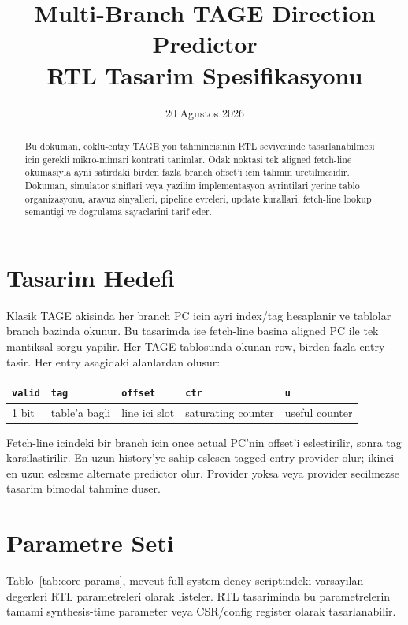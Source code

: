 \documentclass[11pt,a4paper]{article}
\title{Multi-Branch TAGE Direction Predictor\\RTL Tasarim Spesifikasyonu}
\author{}
\date{20 Agustos 2026}
\newcommand{\code}[1]{\texttt{#1}}
\begin{document}
\maketitle

\begin{abstract}
Bu dokuman, coklu-entry TAGE yon tahmincisinin RTL seviyesinde
tasarlanabilmesi icin gerekli mikro-mimari kontrati tanimlar. Odak noktasi
tek aligned fetch-line okumasiyla ayni satirdaki birden fazla branch offset'i
icin tahmin uretilmesidir. Dokuman, simulator siniflari veya yazilim
implementasyon ayrintilari yerine tablo organizasyonu, arayuz sinyalleri,
pipeline evreleri, update kurallari, fetch-line lookup semantigi ve dogrulama
sayaclarini tarif eder.
\end{abstract}

\section{Tasarim Hedefi}

Klasik TAGE akisinda her branch PC icin ayri index/tag hesaplanir ve tablolar
branch bazinda okunur. Bu tasarimda ise fetch-line basina aligned PC ile tek
mantiksal sorgu yapilir. Her TAGE tablosunda okunan row, birden fazla entry
tasir. Her entry asagidaki alanlardan olusur:

\begin{center}
\begin{tabular}{lllll}
\toprule
\code{valid} & \code{tag} & \code{offset} & \code{ctr} & \code{u} \\
\midrule
1 bit & table'a bagli & line ici slot & saturating counter &
useful counter \\
\bottomrule
\end{tabular}
\end{center}

Fetch-line icindeki bir branch icin once actual PC'nin offset'i eslestirilir,
sonra tag karsilastirilir. En uzun history'ye sahip eslesen tagged entry
provider olur; ikinci en uzun eslesme alternate predictor olur. Provider yoksa
veya provider secilmezse tasarim bimodal tahmine duser.

\section{Parametre Seti}

Tablo~\ref{tab:core-params}, mevcut full-system deney scriptindeki varsayilan
degerleri RTL parametreleri olarak listeler. RTL tasariminda bu parametrelerin
tamami synthesis-time parameter veya CSR/config register olarak
tasarlanabilir.
\end{document}
